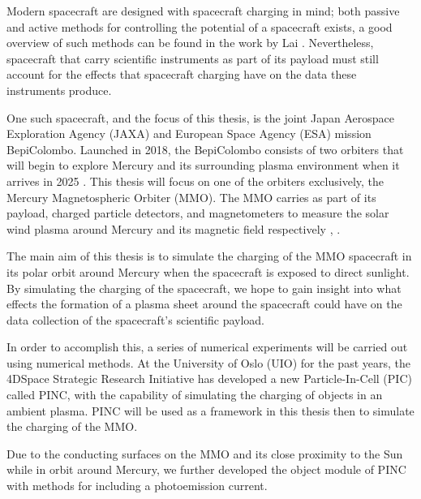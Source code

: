 Modern spacecraft are designed with spacecraft charging in mind; both passive and active methods for controlling the potential of a spacecraft exists, a good overview of such methods can be found in the work by Lai \parencite{Lai2003}. Nevertheless, spacecraft that carry scientific instruments as part of its payload must still account for the effects that spacecraft charging have on the data these instruments produce. 

One such spacecraft, and the focus of this thesis, is the joint Japan Aerospace Exploration Agency (JAXA) and European Space Agency (ESA) mission BepiColombo. Launched in 2018, the BepiColombo consists of two orbiters that will begin to explore Mercury and its surrounding plasma environment when it arrives in 2025 \parencite{Benkhoff2009}. This thesis will focus on one of the orbiters exclusively, the Mercury Magnetospheric Orbiter (MMO). The MMO carries as part of its payload, charged particle detectors, and magnetometers to measure the solar wind plasma around Mercury and its magnetic field respectively \parencite{Saito2010}, \parencite{Benkhoff2009}. 

The main aim of this thesis is to simulate the charging of the MMO spacecraft in its polar orbit around Mercury when the spacecraft is exposed to direct sunlight. By simulating the charging of the spacecraft, we hope to gain insight into what effects the formation of a plasma sheet around the spacecraft could have on the data collection of the spacecraft's scientific payload.

In order to accomplish this, a series of numerical experiments will be carried out using numerical methods. At the University of Oslo (UIO) for the past years, the 4DSpace Strategic Research Initiative has developed a new Particle-In-Cell (PIC) called PINC, with the capability of simulating the charging of objects in an ambient plasma. PINC will be used as a framework in this thesis then to simulate the charging of the MMO.

Due to the conducting surfaces on the MMO and its close proximity to the Sun while in orbit around Mercury, we further developed the object module of PINC with methods for including a photoemission current. 


\newpage